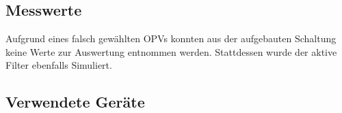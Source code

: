 \documentclass[a4paper]{hitec}
\begin{document}
\subsection{Messwerte}

Aufgrund eines falsch gewählten OPVs konnten aus der aufgebauten Schaltung keine Werte zur Auswertung entnommen werden. Stattdessen wurde der aktive Filter ebenfalls Simuliert.

\subsection{Verwendete Geräte}

\medskip

\begin{devicelist}
\end{devicelist}

\vfill

\IncludeHistoryTimeline
\end{document}
